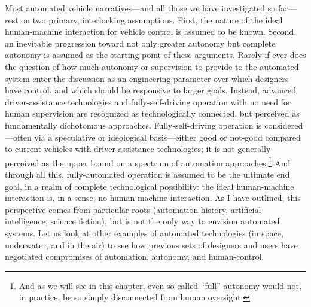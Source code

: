 Most automated vehicle narratives---and all those we have investigated
so far---rest on two primary, interlocking assumptions. First, the nature of the
ideal human-machine interaction for vehicle control is assumed to be
known. Second, an inevitable progression toward not only greater
autonomy but complete autonomy is assumed as the
starting point of these arguments. Rarely if ever does the question of
how much autonomy or supervision to provide to the automated system
enter the discussion as an engineering parameter over which designers
have control, and which should be responsive to larger goals. Instead,
advanced driver-assistance technologies and fully-self-driving
operation with no need for human supervision are recognized as
technologically connected, but perceived as fundamentally dichotomous
approaches. Fully-self-driving operation is considered---often via a
speculative or ideological basis---either good or not-good compared to
current vehicles with driver-assistance technologies; it is not generally
perceived as the upper bound on a spectrum of automation
approaches.\footnote{And as we will see in this chapter, even
  so-called ``full'' autonomy would not, in practice, be so simply
  disconnected from human oversight.} And through all this,
fully-automated operation is assumed to be the ultimate end goal, in a
realm of complete technological possibility: the ideal human-machine
interaction is, in a sense, no human-machine interaction. As I have
outlined, this perspective comes from particular roots (automation
history, artificial intelligence, science fiction), but is not the
only way to envision automated systems. Let us look at
other examples of automated technologies (in space, underwater, and in
the air) to see how previous sets of designers and users have
negotiated compromises of automation, autonomy, and human-control.








